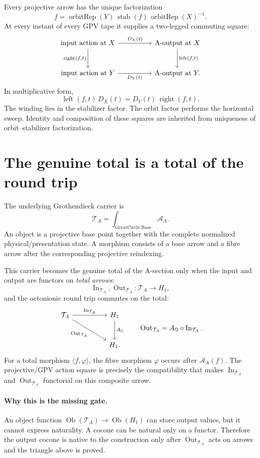\documentclass[11pt]{article}
\newcommand{\OO}{\mathbb O}
\newcommand{\cA}{\mathscr A_A}
\newcommand{\TA}{\mathcal T_A}
\newcommand{\In}{\operatorname{In}}
\newcommand{\Out}{\operatorname{Out}}
\begin{document}
Every projective arrow has the unique factorization
\[
  f
  =
  \operatorname{orbitRep}(Y)\,
  \operatorname{stab}(f)\,
  \operatorname{orbitRep}(X)^{-1}.
\]
At every instant of every GPV tape it supplies a two-legged commuting
square:
\[
\begin{tikzcd}[column sep=huge,row sep=large]
  \text{input action at }X
    \arrow[r,"D_X(t)"]
    \arrow[d,"{\operatorname{right}(f,t)}"']
  & \text{A-output at }X
    \arrow[d,"{\operatorname{left}(f,t)}"] \\
  \text{input action at }Y
    \arrow[r,"D_Y(t)"']
  & \text{A-output at }Y .
\end{tikzcd}
\]
In multiplicative form,
\[
  \operatorname{left}(f,t)\,D_X(t)
  =
  D_Y(t)\,\operatorname{right}(f,t).
\]
The winding lies in the stabilizer factor.  The orbit factor performs the
horizontal sweep.  Identity and composition of these squares are inherited
from uniqueness of orbit--stabilizer factorization.

\section{The genuine total is a total of the round trip}

The underlying Grothendieck carrier is
\[
  \TA
  =
  \int_{\mathrm{GreatCircle.Base}}\cA.
\]
An object is a projective base point together with the complete normalized
physical/presentation state.  A morphism consists of a base arrow and a
fibre arrow after the corresponding projective reindexing.

\medskip
\noindent
This carrier becomes the genuine total of the A-section only when the input
and output are functors on \emph{total arrows}:
\[
  \In_{\TA},\Out_{\TA}\colon\TA\longrightarrow H_1,
\]
and the octonionic round trip commutes on the total:
\[
\begin{tikzcd}[column sep=huge,row sep=large]
  \TA
    \arrow[r,"\In_{\TA}"]
    \arrow[dr,"\Out_{\TA}"']
  & H_1 \arrow[d,"A_{\OO}"] \\
  & H_1 .
\end{tikzcd}
\qquad
\Out_{\TA}=A_{\OO}\circ\In_{\TA}.
\]
For a total morphism $\langle f,\varphi\rangle$, the fibre morphism
$\varphi$ occurs after $\cA(f)$.  The projective/GPV action square is
precisely the compatibility that makes $\In_{\TA}$ and $\Out_{\TA}$
functorial on this composite arrow.

\paragraph{Why this is the missing gate.}
An object function $\operatorname{Ob}(\TA)\to\operatorname{Ob}(H_1)$ can
store output values, but it cannot express naturality.  A cocone can be
natural only on a functor.  Therefore the output cocone is native to the
construction only after $\Out_{\TA}$ acts on arrows and the triangle above
is proved.
\end{document}
